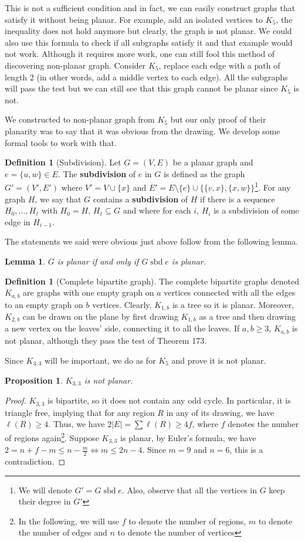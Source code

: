 \documentclass{tufte-handout}
\newtheorem{prop}[thm]{Proposition}
\newtheorem{lem}[thm]{Lemma}
\theoremstyle{definition}
\newtheorem{defn}[thm]{Definition}
\theoremstyle{remark}
\DeclareMathOperator{\sbd}{sbd}
\begin{document}
This is not a sufficient condition and in fact, we can easily construct graphs that satisfy it without being planar. For example, add an isolated vertices to $K_5$, the inequality does not hold anymore but clearly, the graph is not planar. We could also use this formula to check if all subgraphs satisfy it and that example would not work. Although it requires more work, one can still fool this method of discovering non-planar graph. Consider $K_5$, replace each edge with a path of length 2 (in other words, add a middle vertex to each edge). All the subgraphs will pass the test but we can still see that this graph cannot be planar since $K_5$ is not.

We constructed to non-planar graph from $K_5$ but our only proof of their planarity was to say that it was obvious from the drawing. We develop some formal tools to work with that.
\begin{defn}[Subdivision]
	Let $G= (V,E)$ be a planar graph and $e = \{u,w\}\in E$. The \textbf{subdivision} of $e$ in $G$ is defined as the graph $G' = (V',E')$ where $V' = V \cup \{x\}$ and $E' = E \setminus \{e\} \cup \{\{v,x\}, \{x, w\}\}$\footnote{We will denote $G' = G \sbd e$. Also, observe that all the vertices in $G$ keep their degree in $G'$}. For any graph $H$, we say that $G$ contains a \textbf{subdivision} of $H$ if there is a sequence $H_0, \dots, H_{\ell}$ with $H_0 = H$, $H_{\ell} \subseteq G$ and where for each $i$, $H_i$ is a subdivision of some edge in $H_{i-1}$.
\end{defn}
The statements we said were obvious just above follow from the following lemma.
\begin{lem}
	$G$ is planar if and only if $G \sbd e$ is planar.
\end{lem}
\begin{defn}[Complete bipartite graph]
	The complete bipartite graphs denoted $K_{a,b}$ are graphs with one empty graph on $a$ vertices connected with all the edges to an empty graph on $b$ vertices. Clearly, $K_{1,b}$ is a tree so it is planar. Moreover, $K_{2,b}$ can be drawn on the plane by first drawing $K_{1,b}$ as a tree and then drawing a new vertex on the leaves' side, connecting it to all the leaves. If $a, b \geq 3$, $K_{a,b}$ is not planar, although they pass the test of Theorem 173.
\end{defn}
Since $K_{3,3}$ will be important, we do as for $K_5$ and prove it is not planar.
\begin{prop}
	$K_{3,3}$ is not planar.
\end{prop}
\begin{proof}
	$K_{3,3}$ is bipartite, so it does not contain any odd cycle. In particular, it is triangle free, implying that for any region $R$ in any of its drawing, we have $\ell(R) \geq 4$. Thus, we have $2|E| = \sum \ell(R) \geq 4f$, where $f$ denotes the number of regions again\footnote{In the following, we will use $f$ to denote the number of regions, $m$ to denote the number of edges and $n$ to denote the number of vertices}. Suppose $K_{3,3}$ is planar, by Euler's formula, we have $2 = n+f-m \leq n -\frac{m}{2} \Leftrightarrow m \leq 2n-4$. Since $m = 9$ and $n = 6$, this is a contradiction.
\end{proof}
\end{document}
